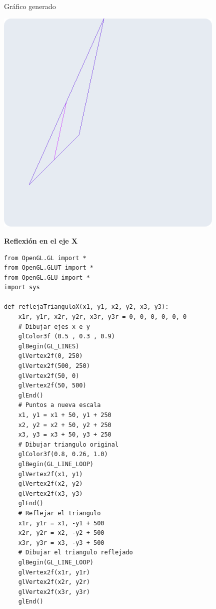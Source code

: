 \documentclass[a4paper]{article}
\begin{document}
\newpage
Gráfico generado 
\begin{center}
\includegraphics[width=11cm]{src/1.png}
\end{center}
\newpage
\Large{\textbf{Reflexión en el eje X}}\\[-0.4cm]
\begin{center}
\begin{mycodeboxl}
\begin{lstlisting}
from OpenGL.GL import *
from OpenGL.GLUT import *
from OpenGL.GLU import *
import sys

def reflejaTrianguloX(x1, y1, x2, y2, x3, y3):
    x1r, y1r, x2r, y2r, x3r, y3r = 0, 0, 0, 0, 0, 0
    # Dibujar ejes x e y 
    glColor3f (0.5 , 0.3 , 0.9)
    glBegin(GL_LINES)
    glVertex2f(0, 250)
    glVertex2f(500, 250)
    glVertex2f(50, 0)
    glVertex2f(50, 500)
    glEnd()
    # Puntos a nueva escala 
    x1, y1 = x1 + 50, y1 + 250
    x2, y2 = x2 + 50, y2 + 250
    x3, y3 = x3 + 50, y3 + 250
    # Dibujar triangulo original
    glColor3f(0.8, 0.26, 1.0)
    glBegin(GL_LINE_LOOP)
    glVertex2f(x1, y1)
    glVertex2f(x2, y2)
    glVertex2f(x3, y3)
    glEnd()
    # Reflejar el triangulo 
    x1r, y1r = x1, -y1 + 500
    x2r, y2r = x2, -y2 + 500
    x3r, y3r = x3, -y3 + 500
    # Dibujar el triangulo reflejado 
    glBegin(GL_LINE_LOOP)
    glVertex2f(x1r, y1r)
    glVertex2f(x2r, y2r)
    glVertex2f(x3r, y3r)
    glEnd()
\end{lstlisting}
\end{mycodeboxl}
\end{center}
\end{document}
